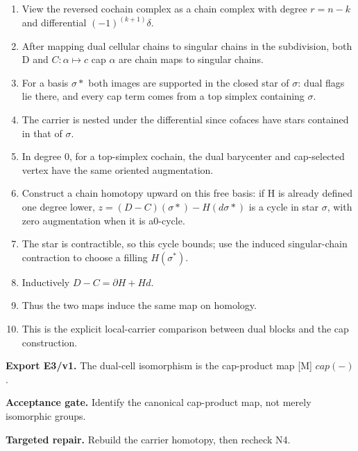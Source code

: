 \documentclass[preprint,12pt,aps,pra,showkeys,amsmath,amssymb,superscriptaddress,floatfix]{revtex4-2}
\theoremstyle{definition}
\theoremstyle{remark}
\newcommand{\field}[2]{\par\smallskip\noindent\textbf{#1.} #2\par}
\begin{document}
\begin{enumerate}[label=N3.\arabic*,leftmargin=3.4em]

\item View the reversed cochain complex as a chain complex with degree
\(r=n-k\) and differential \((-1)^{(k+1)}\delta\).

\item After mapping dual cellular chains to singular chains in the
subdivision, both D and \(C:\alpha \mapsto c\) cap \(\alpha\) are chain
maps to singular chains.

\item For a basis \(\sigma *\) both images are supported in the closed star of
\(\sigma\): dual flags lie there, and every cap term comes from a top
simplex containing \(\sigma\).

\item The carrier is nested under the differential since cofaces have stars
contained in that of \(\sigma\).

\item In degree 0, for a top-simplex cochain, the dual barycenter and
cap-selected vertex have the same oriented augmentation.

\item Construct a chain homotopy upward on this free basis: if H is already
defined one degree lower, \(z=(D-C)(\sigma *)-H(d\sigma *)\) is a cycle
in star \(\sigma\), with zero augmentation when it is a0-cycle.

\item The star is contractible, so this cycle bounds; use the induced
singular-chain contraction to choose a filling \(H(\sigma^*)\).

\item Inductively \(D-C=\partial H+Hd\).

\item Thus the two maps induce the same map on homology.

\item This is the explicit local-carrier comparison between dual blocks and
the cap construction.

\end{enumerate}

\field{Export E3/v1}{The dual-cell isomorphism is the cap-product map {[}M{]} \(cap(-)\).}

\field{Acceptance gate}{Identify the canonical cap-product map, not merely isomorphic groups.}

\field{Targeted repair}{Rebuild the carrier homotopy, then recheck N4.}
\end{document}
